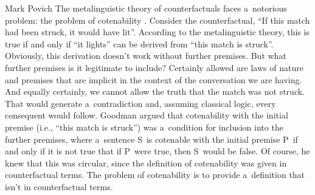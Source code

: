 \begin{artengenv}{Mark Povich}
The metalinguistic theory of counterfactuals faces a~notorious problem: the problem of cotenability
\parencite[][]{goodman_problem_1947}. %
 Consider the counterfactual, ``If this match had been struck, it would have lit''. According to the metalinguistic theory, this is true if and only if ``it lights'' can be derived from ``this match is struck''. Obviously, this derivation doesn't work without further premises. But what further premises is it legitimate to include? Certainly allowed are laws of nature and premises that are implicit in the context of the conversation we are having. And equally certainly, we cannot allow the truth that the match was not struck. That would generate a~contradiction and, assuming classical logic, every consequent would follow. Goodman 
\parencite*[][]{goodman_problem_1947} %
 argued that cotenability with the initial premise (i.e., ``this match is struck'') was a~condition for inclusion into the further premises, where a~sentence S~is cotenable with the initial premise P~if and only if it is not true that if P~were true, then S~would be false. Of course, he knew that this was circular, since the definition of cotenability was given in counterfactual terms. The problem of cotenability is to provide a~definition that isn't in counterfactual terms.


\end{artengenv}
